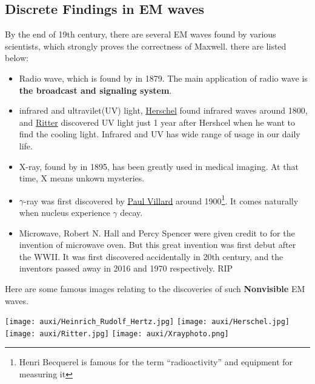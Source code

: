 \documentclass[a4paper]{tufte-handout}
\begin{document}
\subsection{Discrete Findings in EM waves}
By the end of 19th century, there are several EM waves found by various scientists, which strongly proves the correctness of Maxwell. there are listed below:
\begin{itemize}
  \item Radio wave, which is found by \uline{\hspace{0.7in}} in 1879. The main application of radio wave is \textbf{the broadcast and signaling system}.
  \item infrared and ultravilet(UV) light, \href{https://astronomy.swin.edu.au/cosmos/i/Infrared}{Herschel} found infrared waves around 1800, and \href{https://pubmed.ncbi.nlm.nih.gov/3301744/}{Ritter} discovered UV light just 1 year after Hershcel when he want to find the cooling light. Infrared and UV has wide range of usage in our daily life.
  \item X-ray, found by \uline{\hspace{0.7in}} in 1895, has been greatly used in medical imaging. At that time, X means unkown mysteries. 
  \item $\gamma$-ray was first discovered by \href{https://link.springer.com/article/10.1007/s000160050028}{Paul Villard} around 1900\footnote{Henri Becquerel is famous for the term ``radioactivity'' and equipment for measuring it}. It comes naturally when nucleus experience $\gamma$ decay.
  \item Microwave, Robert N. Hall and Percy Spencer were given credit to for the invention of microwave oven. But this great invention was first debut after the WWII. It was first discovered accidentally in 20th century, and the inventors passed away in 2016 and 1970 respectively. RIP
\end{itemize}
Here are some famous images relating to the discoveries of such \textbf{Nonvisible} EM waves.
\begin{figure*} %
\texttt{[image: auxi/Heinrich\_Rudolf\_Hertz.jpg]}
\texttt{[image: auxi/Herschel.jpg]}
\\
\texttt{[image: auxi/Ritter.jpg]}
\texttt{[image: auxi/Xrayphoto.png]}
\end{figure*}
\end{document}
